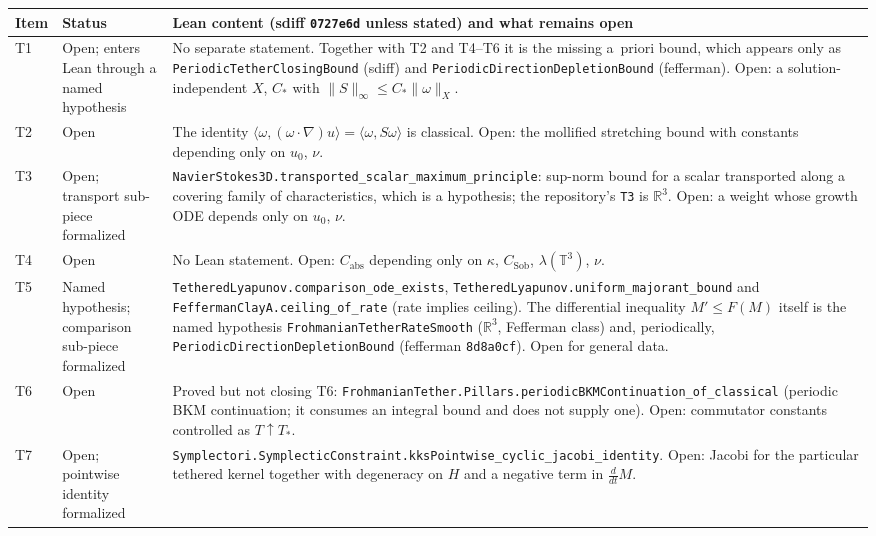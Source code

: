 \documentclass[11pt]{article}
\theoremstyle{plain}
\theoremstyle{definition}
\theoremstyle{remark}
\newcommand{\Tthree}{\mathbb{T}^{3}}
\newcommand{\R}{\mathbb{R}}
\newcommand{\lean}[1]{\nolinkurl{#1}}
\newcommand{\sdiffsha}{0727e6d}
\newcommand{\fefsha}{8d8a0cf}
\begin{document}
\begin{center}
\small
\begin{tabularx}{\linewidth}{@{}>{\raggedright\arraybackslash}p{0.38in}>{\raggedright\arraybackslash}p{1.25in}>{\raggedright\arraybackslash}X@{}}
\toprule
Item & Status & Lean content (sdiff \texttt{\sdiffsha} unless stated) and what remains open \\
\midrule
T1 & Open; enters Lean through a named hypothesis & No separate statement. Together with T2 and T4--T6 it is the missing a~priori bound, which appears only as \lean{PeriodicTetherClosingBound} (sdiff) and \lean{PeriodicDirectionDepletionBound} (fefferman). Open: a solution-independent \(X\), \(C_{\ast}\) with \(\|S\|_{\infty}\le C_{\ast}\|\omega\|_{X}\). \\
T2 & Open & The identity \(\langle\omega,(\omega\cdot\nabla)u\rangle=\langle\omega,S\omega\rangle\) is classical. Open: the mollified stretching bound with constants depending only on \(u_{0}\), \(\nu\). \\
T3 & Open; transport sub-piece formalized & \lean{NavierStokes3D.transported_scalar_maximum_principle}: sup-norm bound for a scalar transported along a covering family of characteristics, which is a hypothesis; the repository's \texttt{T3} is \(\R^{3}\). Open: a weight whose growth ODE depends only on \(u_{0}\), \(\nu\). \\
T4 & Open & No Lean statement. Open: \(C_{\mathrm{abs}}\) depending only on \(\kappa\), \(C_{\mathrm{Sob}}\), \(\lambda(\Tthree)\), \(\nu\). \\
T5 & Named hypothesis; comparison sub-piece formalized & \lean{TetheredLyapunov.comparison_ode_exists}, \lean{TetheredLyapunov.uniform_majorant_bound} and \lean{FeffermanClayA.ceiling_of_rate} (rate implies ceiling). The differential inequality \(M'\le F(M)\) itself is the named hypothesis \lean{FrohmanianTetherRateSmooth} (\(\R^{3}\), Fefferman class) and, periodically, \lean{PeriodicDirectionDepletionBound} (fefferman \texttt{\fefsha}). Open for general data. \\
T6 & Open & Proved but not closing T6: \lean{FrohmanianTether.Pillars.periodicBKMContinuation_of_classical} (periodic BKM continuation; it consumes an integral bound and does not supply one). Open: commutator constants controlled as \(T\uparrow T_{\ast}\). \\
T7 & Open; pointwise identity formalized & \lean{Symplectori.SymplecticConstraint.kksPointwise_cyclic_jacobi_identity}. Open: Jacobi for the particular tethered kernel together with degeneracy on \(H\) and a negative term in \(\frac{d}{dt}M\). \\

\end{tabularx}
\end{center}
\end{document}
